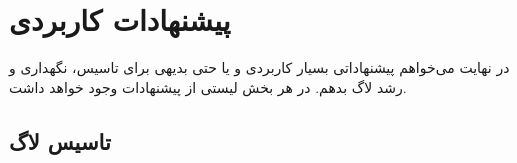 \section{پیشنهادات کاربردی}

در نهایت می‌خواهم پیشنهاداتی بسیار کاربردی و یا حتی بدیهی برای تاسیس،
نگهداری و رشد لاگ بدهم. در هر بخش لیستی از پیشنهادات وجود خواهد داشت.

\subsection{تاسیس لاگ}


